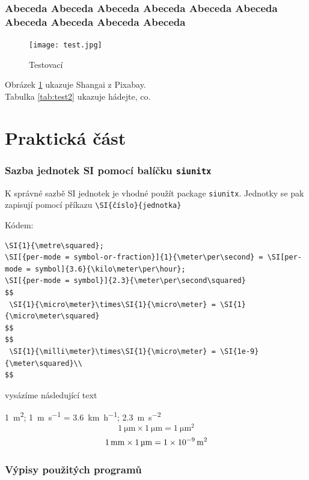 \documentclass[12pt]{report}			%
\begin{document}
				\lipsum[2]

			\section[X-krát Abeceda]{Abeceda Abeceda Abeceda Abeceda Abeceda Abeceda Abeceda Abeceda Abeceda Abeceda }
				\begin{figure}
				  \texttt{[image: test.jpg]}
				  \caption{Testovací}
				  \label{fig:test}
				\end{figure}
				Obrázek \ref{fig:test} ukazuje Shangai z Pixabay.\\
				Tabulka \ref{tab:test2} ukazuje hádejte, co.
		
	\lipsum[3]

	\part{Praktická část}

\section{Sazba jednotek SI pomocí balíčku \texttt{siunitx}}

K správné sazbě SI jednotek je vhodné použít package \texttt{siunitx}.
Jednotky se pak zapisují pomocí příkazu \verb|\SI{číslo}{jednotka}|  

Kódem: 
{\footnotesize
\begin{verbatim}
\SI{1}{\metre\squared}; 
\SI[{per-mode = symbol-or-fraction}]{1}{\meter\per\second} = \SI[per-mode = symbol]{3.6}{\kilo\meter\per\hour};
\SI[{per-mode = symbol}]{2.3}{\meter\per\second\squared} 
$$
 \SI{1}{\micro\meter}\times\SI{1}{\micro\meter} = \SI{1}{\micro\meter\squared}
$$ 
$$
 \SI{1}{\milli\meter}\times\SI{1}{\micro\meter} = \SI{1e-9}{\meter\squared}\\
$$
\end{verbatim}}
vysázíme následující text

\SI{1}{\metre\squared}; 
  \SI[{per-mode = symbol-or-fraction}]{1}{\meter\per\second} = \SI[per-mode = symbol]{3.6}{\kilo\meter\per\hour};
  \SI[{per-mode = symbol}]{2.3}{\meter\per\second\squared} 
$$
   \SI{1}{\micro\meter}\times\SI{1}{\micro\meter} = \SI{1}{\micro\meter\squared}
$$ 
$$
   \SI{1}{\milli\meter}\times\SI{1}{\micro\meter} = \SI{1e-9}{\meter\squared}\\
$$

\section{Výpisy použitých programů}
\end{document}
